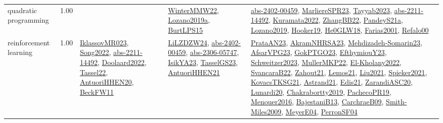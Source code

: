 {\begin{longtable}{p{3cm}r>{\raggedright\arraybackslash}p{6cm}>{\raggedright\arraybackslash}p{6cm}>{\raggedright\arraybackslash}p{8cm}}
\index{quadratic programming}\index{Algorithms!quadratic programming}quadratic programming &  1.00 &  & \hyperref[detail:WinterMMW22]{WinterMMW22}, \hyperref[detail:Lozano2019a]{Lozano2019a}, \hyperref[detail:BurtLPS15]{BurtLPS15} & \hyperref[detail:abs-2402-00459]{abs-2402-00459}, \hyperref[detail:MarliereSPR23]{MarliereSPR23}, \hyperref[detail:Tayyab2023]{Tayyab2023}, \hyperref[detail:abs-2211-14492]{abs-2211-14492}, \hyperref[detail:Kuramata2022]{Kuramata2022}, \hyperref[detail:ZhangBB22]{ZhangBB22}, \hyperref[detail:PandeyS21a]{PandeyS21a}, \hyperref[detail:Lozano2019]{Lozano2019}, \hyperref[detail:Hooker19]{Hooker19}, \hyperref[detail:He0GLW18]{He0GLW18}, \hyperref[detail:Farias2001]{Farias2001}, \hyperref[detail:Refalo00]{Refalo00}\\
\index{reinforcement learning}\index{Algorithms!reinforcement learning}reinforcement learning &  1.00 & \hyperref[detail:IklassovMR023]{IklassovMR023}, \hyperref[detail:Song2022]{Song2022}, \hyperref[detail:abs-2211-14492]{abs-2211-14492}, \hyperref[detail:Doolaard2022]{Doolaard2022}, \hyperref[detail:Tassel22]{Tassel22}, \hyperref[detail:AntuoriHHEN20]{AntuoriHHEN20}, \hyperref[detail:BeckFW11]{BeckFW11} & \hyperref[detail:LiLZDZW24]{LiLZDZW24}, \hyperref[detail:abs-2402-00459]{abs-2402-00459}, \hyperref[detail:abs-2306-05747]{abs-2306-05747}, \hyperref[detail:IsikYA23]{IsikYA23}, \hyperref[detail:TasselGS23]{TasselGS23}, \hyperref[detail:AntuoriHHEN21]{AntuoriHHEN21} & \hyperref[detail:PrataAN23]{PrataAN23}, \hyperref[detail:AkramNHRSA23]{AkramNHRSA23}, \hyperref[detail:Mehdizadeh-Somarin23]{Mehdizadeh-Somarin23}, \hyperref[detail:AfsarVPG23]{AfsarVPG23}, \hyperref[detail:GokPTGO23]{GokPTGO23}, \hyperref[detail:EfthymiouY23]{EfthymiouY23}, \hyperref[detail:Schweitzer2023]{Schweitzer2023}, \hyperref[detail:MullerMKP22]{MullerMKP22}, \hyperref[detail:El-Kholany2022]{El-Kholany2022}, \hyperref[detail:SvancaraB22]{SvancaraB22}, \hyperref[detail:Zahout21]{Zahout21}, \hyperref[detail:Lemos21]{Lemos21}, \hyperref[detail:Liu2021]{Liu2021}, \hyperref[detail:Spieker2021]{Spieker2021}, \hyperref[detail:KovacsTKSG21]{KovacsTKSG21}, \hyperref[detail:Astrand21]{Astrand21}, \hyperref[detail:Edis21]{Edis21}, \hyperref[detail:ZarandiASC20]{ZarandiASC20}, \hyperref[detail:Lunardi20]{Lunardi20}, \hyperref[detail:Chakrabortty2019]{Chakrabortty2019}, \hyperref[detail:PachecoPR19]{PachecoPR19}, \hyperref[detail:Menouer2016]{Menouer2016}, \hyperref[detail:BajestaniB13]{BajestaniB13}, \hyperref[detail:CarchraeB09]{CarchraeB09}, \hyperref[detail:Smith-Miles2009]{Smith-Miles2009}, \hyperref[detail:MeyerE04]{MeyerE04}, \hyperref[detail:PerronSF04]{PerronSF04}\\

\end{longtable}}
